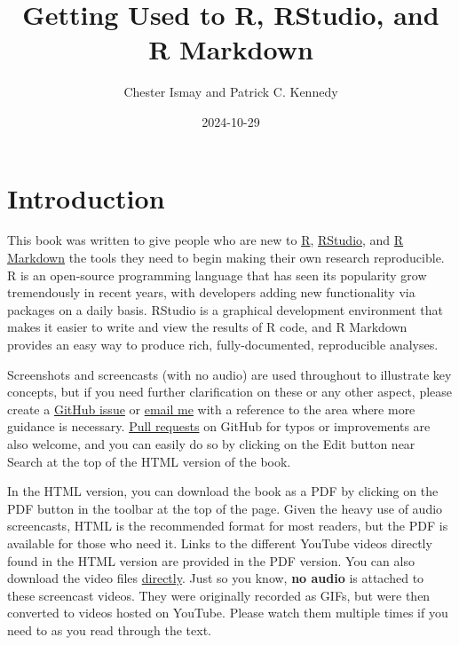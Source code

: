 \documentclass[]{tufte-book}
\title{Getting Used to R, RStudio, and R Markdown}
\author{Chester Ismay and Patrick C. Kennedy}
\date{2024-10-29}
\begin{document}
\maketitle



{
\setcounter{tocdepth}{1}
\tableofcontents
}

\chapter{Introduction}\label{intro}

This book was written to give people who are new to \href{https://www.r-project.org}{R}, \href{https://posit.co/downloads/}{RStudio}, and \href{http://rmarkdown.rstudio.com}{R Markdown} the tools they need to begin making their own research reproducible. R is an open-source programming language that has seen its popularity grow tremendously in recent years, with developers adding new functionality via packages on a daily basis. RStudio is a graphical development environment that makes it easier to write and view the results of R code, and R Markdown provides an easy way to produce rich, fully-documented, reproducible analyses.

Screenshots and screencasts (with no audio) are used throughout to illustrate key concepts, but if you need further clarification on these or any other aspect, please create a \href{https://github.com/ismayc/rbasics-book/issues}{GitHub issue} or \href{mailto:chester.ismay@gmail.com}{email me} with a reference to the area where more guidance is necessary. \href{https://code.tutsplus.com/courses/git-basics-github-pull-requests}{Pull requests} on GitHub for typos or improvements are also welcome, and you can easily do so by clicking on the Edit button near Search at the top of the HTML version of the book.

In the HTML version, you can download the book as a PDF by clicking on the PDF button in the toolbar at the top of the page. Given the heavy use of audio screencasts, HTML is the recommended format for most readers, but the PDF is available for those who need it. Links to the different YouTube videos directly found in the HTML version are provided in the PDF version. You can also download the video files \href{https://github.com/ismayc/rbasics-book/tree/master/mp4}{directly}. Just so you know, \textbf{no audio} is attached to these screencast videos. They were originally recorded as GIFs, but were then converted to videos hosted on YouTube. Please watch them multiple times if you need to as you read through the text.
\end{document}
